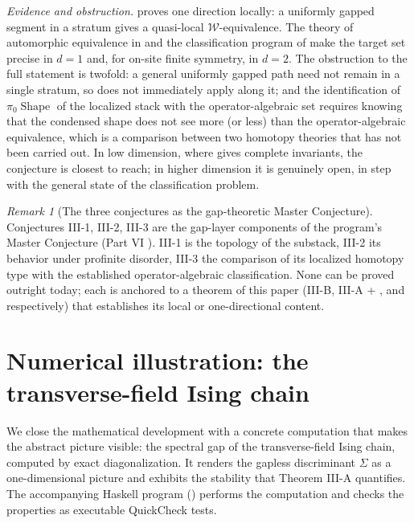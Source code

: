 \documentclass[12pt]{article}
\newcommand{\Shape}{\operatorname{Shape}}      %
\newcommand{\Weq}{\mathcal{W}}                 %
\newcommand{\Sig}{\Sigma}                       %
\theoremstyle{plain}
\theoremstyle{definition}
\theoremstyle{remark}
\newtheorem{remark}[remark]{Remark}
\begin{document}
\emph{Evidence and obstruction.}  proves one direction locally: a
uniformly gapped segment in a stratum gives a quasi-local $\Weq$-equivalence. The
theory of automorphic equivalence in \cite{bmns-automorphic} and the classification
program of \cite{ogata-classification-review} make the target set precise in $d=1$
and, for on-site finite symmetry, in $d=2$. The obstruction to the full statement is
twofold: a general uniformly gapped path need not remain in a single stratum, so
 does not immediately apply along it; and the identification of
$\pi_0\Shape$ of the localized stack with the operator-algebraic set requires knowing
that the condensed shape does not see more (or less) than the operator-algebraic
equivalence, which is a comparison between two homotopy theories that has not been
carried out. In low dimension, where \cite{ogata-classification-review} gives complete
invariants, the conjecture is closest to reach; in higher dimension it is genuinely
open, in step with the general state of the classification problem.

\begin{remark}[The three conjectures as the gap-theoretic Master Conjecture]
\label{rem:master}
Conjectures III-1, III-2, III-3 are the gap-layer components of the program's Master
Conjecture (Part VI \cite{paperSynthesis}). III-1 is the topology of the substack,
III-2 its behavior under profinite disorder, III-3 the comparison of its localized
homotopy type with the established operator-algebraic classification. None can be
proved outright today; each is anchored to a theorem of this paper (III-B, III-A +
, and  respectively) that establishes its local or
one-directional content.
\end{remark}

\section[Numerical illustration: the transverse-field Ising chain]{Numerical illustration: the\\ transverse-field Ising chain}
\label{sec:numerics}

We close the mathematical development with a concrete computation that makes the
abstract picture visible: the spectral gap of the transverse-field Ising chain,
computed by exact diagonalization. It renders the gapless discriminant $\Sig$ as a
one-dimensional picture and exhibits the stability that Theorem III-A quantifies.
The accompanying Haskell program () performs the computation
and checks the properties as executable QuickCheck tests.
\end{document}
